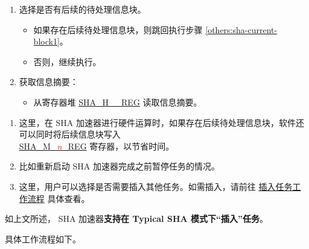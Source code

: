 \documentclass[main\_\_CN.tex]{subfiles}
\begin{document}
\begin{enumerate}
    \item 选择是否有后续的待处理信息块。
    \begin{itemize}
        \item 如果存在后续待处理信息块，则跳回执行步骤 \ref{others:sha-current-block1}。
        \item 否则，继续执行。
    \end{itemize}
    
    \item 获取信息摘要：
    \begin{itemize}
        \item 从寄存器堆 \hyperref[regdesc:SHAHNREG]{SHA\_H\_\_REG} 读取信息摘要。
    \end{itemize}
\end{enumerate}

\begin{tiplisting}\label{others:sha-note-typical-sha}
\vspace{-2.5em}
\begin{enumerate}
\item 这里，在 SHA 加速器进行硬件运算时，如果存在后续待处理信息块，软件还可以同时将后续信息块写入 \\ \hyperref[regdesc:SHAMNREG]{SHA\_M\_\textcolor{red}{\it{n}}\_REG} 寄存器，以节省时间。
\item 比如重新启动 SHA 加速器完成之前暂停任务的情况。
\item 这里，用户可以选择是否需要插入其他任务。如需插入，请前往 \hyperref[others:sha-interleaved]{插入任务工作流程} 具体查看。
\end{enumerate}
\end{tiplisting}

\label{others:sha-interleaved}如上文所述，\chipname{} SHA 加速器\textbf{支持在 Typical SHA 模式下“插入”任务}。

具体工作流程如下。
\end{document}
